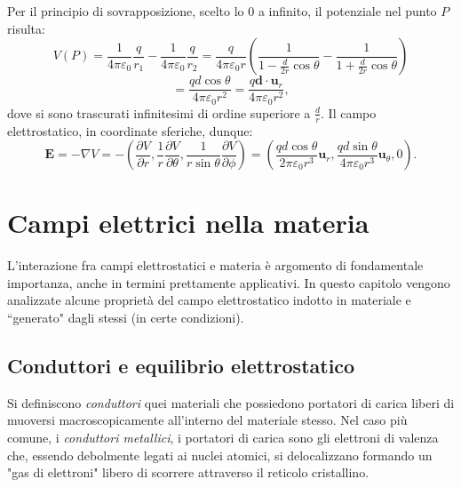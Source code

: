 \documentclass[a4paper,11pt]{report}
\begin{document}
Per il principio di sovrapposizione, scelto lo $0$ a infinito, il potenziale nel punto $P$ risulta:
\begin{equation}
    V(P) = \frac{1}{4\pi\varepsilon_0}\frac{q}{r_1} - \frac{1}{4\pi\varepsilon_0}\frac{q}{r_2} = \frac{q}{4\pi\varepsilon_0r}\left(\frac{1}{1-\frac{d}{2r}\cos \theta} - \frac{1}{1+\frac{d}{2r}\cos \theta}\right)
\end{equation}
\begin{equation}
    = \frac{qd\cos\theta}{4\pi\varepsilon_0r^2} = \frac{q\bm{d}\cdot\bm{u}_r}{4\pi\varepsilon_0r^2},
\end{equation}
dove si sono trascurati infinitesimi di ordine superiore a $\frac{d}{r}$. 
Il campo elettrostatico, in coordinate sferiche, dunque:
\begin{equation}
    \bm{E} = -\nabla V = -\left(\frac{\partial V}{\partial r},\frac{1}{r} \frac{\partial V}{\partial \theta}, \frac{1}{r\sin\theta}\frac{\partial V}{\partial \phi}\right) = \left(\frac{qd\cos\theta}{2\pi \varepsilon_0r^3}\bm{u}_r, \frac{qd\sin\theta}{4\pi \varepsilon_0r^3}\bm{u}_{\theta}, 0\right).
\end{equation}








\chapter{Campi elettrici nella materia}

L'interazione fra campi elettrostatici e materia è argomento di fondamentale importanza, anche in termini prettamente applicativi. In questo capitolo vengono analizzate alcune proprietà del campo elettrostatico indotto in materiale e “generato" dagli stessi (in certe condizioni). 

\section{Conduttori e equilibrio elettrostatico}

Si definiscono \textit{conduttori} quei materiali che possiedono portatori di carica liberi di muoversi macroscopicamente all'interno del materiale stesso.
Nel caso più comune, i \textit{conduttori metallici}, i portatori di carica sono gli elettroni di valenza che, essendo debolmente legati ai nuclei atomici, si delocalizzano formando un "gas di elettroni" libero di scorrere attraverso il reticolo cristallino.
\end{document}

